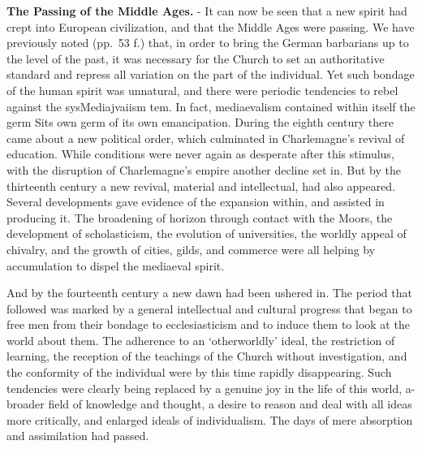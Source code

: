 \documentclass[
]{book}
\begin{document}
\textbf{The Passing of the Middle Ages.} - It can now be seen that a new spirit had crept into European civilization, and that the Middle Ages were passing. We have previously noted (pp.~53 f.) that, in order to bring the German barbarians up to the level of the past, it was necessary for the Church to set an authoritative standard and repress all variation on the part of the individual. Yet such bondage of the human spirit was unnatural, and there were periodic tendencies to rebel against the sysMediajvaiism tem. In fact, mediaevalism contained within itself the germ Sits own germ of its own emancipation. During the eighth century there came about a new political order, which culminated in Charlemagne's revival of education. While conditions were never again as desperate after this stimulus, with the disruption of Charlemagne's empire another decline set in. But by the thirteenth century a new revival, material and intellectual, had also appeared. Several developments gave evidence of the expansion within, and assisted in producing it. The broadening of horizon through contact with the Moors, the development of scholasticism, the evolution of universities, the worldly appeal of chivalry, and the growth of cities, gilds, and commerce were all helping by accumulation to dispel the mediaeval spirit.

And by the fourteenth century a new dawn had been ushered in. The period that followed was marked by a general intellectual and cultural progress that began to free men from their bondage to ecclesiasticism and to induce them to look at the world about them. The adherence to an `otherworldly' ideal, the restriction of learning, the reception of the teachings of the Church without investigation, and the conformity of the individual were by this time rapidly disappearing. Such tendencies were clearly being replaced by a genuine joy in the life of this world, a- broader field of knowledge and thought, a desire to reason and deal with all ideas more critically, and enlarged ideals of individualism. The days of mere absorption and assimilation had passed.
\end{document}
